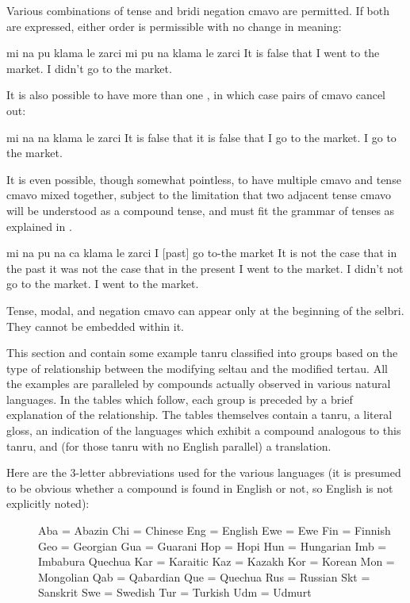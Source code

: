 Various combinations of tense and bridi negation cmavo are
    permitted. If both are expressed, either order is permissible
    with no change in meaning:
\begin{example}
mi na pu klama le zarci\n
mi pu na klama le zarci\n
It is false that I went to the market.\n
I didn't go to the market.
\end{example}

It is also possible to have more than one , in which case
    pairs of  cmavo cancel out:
\begin{example}
mi na na klama le zarci\n
It is false that it is false that I go to the market.\n
I go to the market.
\end{example}

It is even possible, though somewhat pointless, to have
    multiple  cmavo and tense cmavo mixed together, subject
    to the limitation that two adjacent tense cmavo will be
    understood as a compound tense, and must fit the grammar of
    tenses as explained in .
\begin{example}
mi na pu na ca klama le zarci\n
I  [past]\n
\T	[not] [present] go to-the market\n
It is not the case that in the past it was not\n
\T	the case that in the present I went\n
\T	to the market.\n
I didn't not go to the market.\n
I went to the market.
\end{example}

Tense, modal, and negation cmavo can appear only at the
    beginning of the selbri. They cannot be embedded within it.



This section and  contain some
    example tanru classified into groups based on the type of
    relationship between the modifying seltau and the modified
    tertau. All the examples are paralleled by compounds actually
    observed in various natural languages. In the tables which
    follow, each group is preceded by a brief explanation of the
    relationship. The tables themselves contain a tanru, a literal
    gloss, an indication of the languages which exhibit a compound
    analogous to this tanru, and (for those tanru with no English
    parallel) a translation.

Here are the 3-letter abbreviations used for the various
    languages (it is presumed to be obvious whether a compound is
    found in English or not, so English is not explicitly
    noted):
\begin{description}
\item[] Aba = Abazin Chi = Chinese Eng = English Ewe = Ewe Fin = Finnish Geo = Georgian Gua = Guarani Hop = Hopi Hun = Hungarian Imb = Imbabura Quechua Kar = Karaitic Kaz = Kazakh Kor = Korean Mon = Mongolian Qab = Qabardian Que = Quechua Rus = Russian Skt = Sanskrit Swe = Swedish Tur = Turkish Udm = Udmurt

\end{description}

